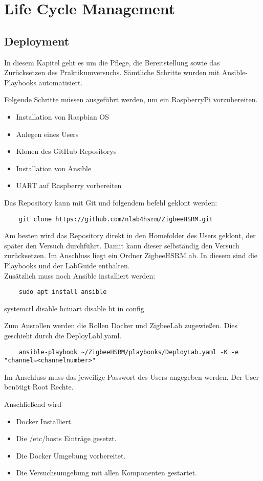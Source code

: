 \chapter{Life Cycle Management}
\section{Deployment}
In diesem Kapitel geht es um die Pflege, die Bereitstellung sowie das Zurücksetzen des Praktikumversuchs. Sämtliche Schritte wurden mit Ansible-Playbooks
automatisiert.

Folgende Schritte müssen ausgeführt werden, um ein RaspberryPi vorzubereiten.
\begin{itemize}
    \item Installation von Raspbian OS
    \item Anlegen eines Users
    \item Klonen des GitHub Repositorys 
    \item Installation von Ansible
    \item UART auf Raspberry vorbereiten
\end{itemize}

Das Repository kann mit Git und folgendem befehl geklont werden:
\begin{lstlisting}
    git clone https://github.com/nlab4hsrm/ZigbeeHSRM.git
\end{lstlisting}
Am besten wird das Repository direkt in den Homefolder des Users geklont, der später den Versuch durchführt. Damit kann dieser selbständig den Versuch zurücksetzen. Im Anschluss liegt ein Ordner
\grqq ZigbeeHSRM\grqq{} ab. In diesem sind die Playbooks und der LabGuide enthalten.\\
Zusätzlich muss noch Ansible installiert werden:
\begin{lstlisting}
    sudo apt install ansible
\end{lstlisting}

systemctl disable hciuart
disable bt in config


Zum Ausrollen werden die Rollen \grqq Docker\grqq{} und \grqq ZigbeeLab\grqq{} zugewießen. Dies geschieht durch die DeployLabl.yaml.
\begin{lstlisting}
    ansible-playbook ~/ZigbeeHSRM/playbooks/DeployLab.yaml -K -e "channel=<channelnumber>"
\end{lstlisting}
Im Anschluss muss das jeweilige Passwort des Users angegeben werden. Der User benötigt Root Rechte.

Anschließend wird
\begin{itemize}
    \item Docker Installiert.
    \item Die /etc/hosts Einträge gesetzt.
    \item Die Docker Umgebung vorbereitet.
    \item Die Versuchsumgebung mit allen Komponenten gestartet.
\end{itemize}

